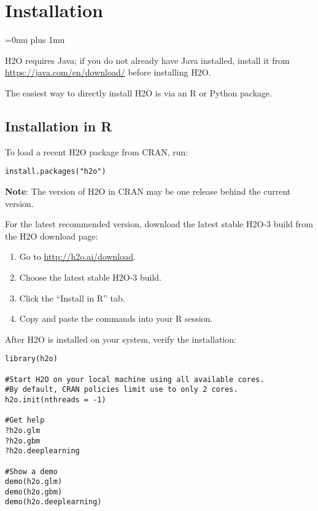 \documentclass{standalone}
\begin{document}
\section{Installation} 
\Urlmuskip=0mu plus 1mu\relax %

H2O requires Java; if you do not already have Java installed, install it from {\url{https://java.com/en/download/}} before installing H2O. 

The easiest way to directly install H2O is  via an R or Python package.


\subsection{Installation in R}

To load a recent H2O package from CRAN, run:

\begin{lstlisting}[style=R]
install.packages("h2o")
\end{lstlisting}

{\bf{Note}}: The version of H2O in CRAN may be one release behind the current version.

For the latest recommended version, download the
latest stable H2O-3 build from the H2O download page:

\begin{minipage}{\textwidth}

\begin{enumerate}
\item Go to {\url{http://h2o.ai/download}}.
\item Choose the latest stable H2O-3 build.
\item Click the ``Install in R'' tab.
\item Copy and paste the commands into your R session.
\end{enumerate}

\end{minipage}

After H2O is installed on your system, verify the installation:

\begin{minipage}{\textwidth}

\begin{lstlisting}[style=R]
library(h2o)

#Start H2O on your local machine using all available cores.
#By default, CRAN policies limit use to only 2 cores.
h2o.init(nthreads = -1)

#Get help
?h2o.glm
?h2o.gbm
?h2o.deeplearning

#Show a demo
demo(h2o.glm)
demo(h2o.gbm)
demo(h2o.deeplearning)
\end{lstlisting}

\end{minipage}
\end{document}
